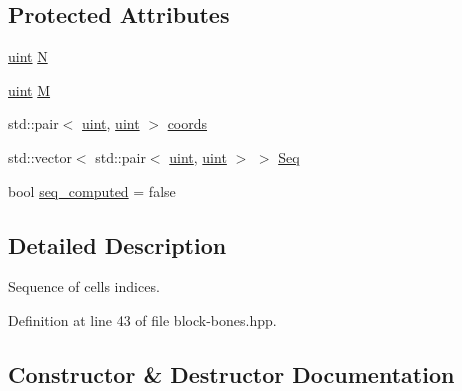 \subsection*{Protected Attributes}
\begin{DoxyCompactItemize}
\item 
\hyperlink{typedefs_8hpp_a91ad9478d81a7aaf2593e8d9c3d06a14}{uint} \hyperlink{class_cell_seq_a407684cfa214fe0b2d4d1ed25936d037}{N}
\item 
\hyperlink{typedefs_8hpp_a91ad9478d81a7aaf2593e8d9c3d06a14}{uint} \hyperlink{class_cell_seq_a8710fd7f03b3f4423e90f4a2910ad98b}{M}
\item 
std\+::pair$<$ \hyperlink{typedefs_8hpp_a91ad9478d81a7aaf2593e8d9c3d06a14}{uint}, \hyperlink{typedefs_8hpp_a91ad9478d81a7aaf2593e8d9c3d06a14}{uint} $>$ \hyperlink{class_cell_seq_af68709ebb782d4ffc243788c3dd256f4}{coords}
\item 
std\+::vector$<$ std\+::pair$<$ \hyperlink{typedefs_8hpp_a91ad9478d81a7aaf2593e8d9c3d06a14}{uint}, \hyperlink{typedefs_8hpp_a91ad9478d81a7aaf2593e8d9c3d06a14}{uint} $>$ $>$ \hyperlink{class_cell_seq_af15df5f62488560f36f71336ac5cb0a5}{Seq}
\item 
bool \hyperlink{class_cell_seq_aa813f6c9f5438cc472a0c12078b44c97}{seq\+\_\+computed} = false
\end{DoxyCompactItemize}


\subsection{Detailed Description}
Sequence of cells indices. 



Definition at line 43 of file block-\/bones.\+hpp.



\subsection{Constructor \& Destructor Documentation}
\mbox{\label{class_cell_seq_a3f1fcc18a3e9a9572d403791368f0db7}} 
